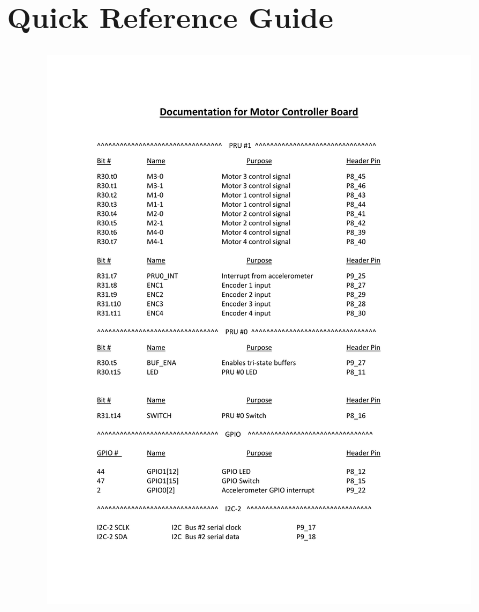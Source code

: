 \documentclass[12pt,oneside,final]{siuethesis}
\theoremstyle{definition}
\begin{document}
\section{Quick Reference Guide}
\begin{figure}[!h]
   \centering
   \includegraphics[scale=0.67,keepaspectratio=true]{./images/pins.pdf}
\end{figure}
\end{document}

